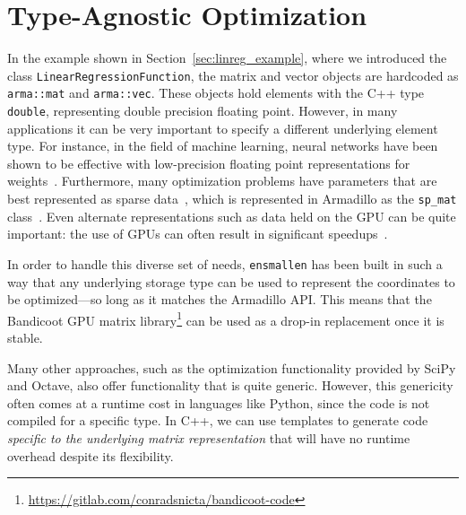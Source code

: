 \section{Type-Agnostic Optimization}
\label{sec:templated_optimize}


In the example shown in Section~\ref{sec:linreg_example},
where we introduced the class {\tt LinearRegressionFunction},
the matrix and vector objects are hardcoded as {\tt arma::mat} and {\tt arma::vec}.
These objects hold elements with the C++ type {\tt double},
representing double precision floating point.
However, in many applications it can be very important to specify a different
underlying element type.  For instance, in the field of machine learning, neural
networks have been shown to be effective with low-precision floating point
representations for weights~\cite{vanhoucke2011improving}.
Furthermore, many optimization problems have parameters
that are best represented as sparse data~\cite{van2011sparse, recht2011hogwild},
which is represented in Armadillo as the {\tt sp\_mat} class~\cite{sanderson2018user, mca24030070}.
Even alternate representations such as data held on the GPU can be quite
important: the use of GPUs can often result in significant
speedups~\cite{oh2004gpu, athanasopoulos2011gpu}.

In order to handle this diverse set of needs, {\tt ensmallen} has been built in
such a way that any underlying storage type can be used to represent the
coordinates to be optimized---so long as it matches the Armadillo API.
This means that the Bandicoot GPU matrix library\footnote{\url{https://gitlab.com/conradsnicta/bandicoot-code}}
can be used as a drop-in replacement once it is stable.

Many other approaches, such as the optimization functionality provided by SciPy and Octave,
also offer functionality that is quite generic.  However, this genericity often
comes at a runtime cost in languages like Python, since the code is not compiled
for a specific type.  In C++, we can use templates to generate code {\it
specific to the underlying matrix representation} that will have no runtime
overhead despite its flexibility.

